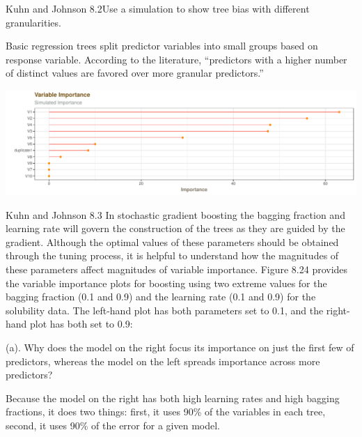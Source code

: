 \documentclass[]{report}
\begin{document}

\begin{question}{Kuhn and Johnson 8.2}Use a simulation to show tree bias with different granularities.\end{question}

Basic regression trees split predictor variables into small groups based
on response variable. According to the literature, ``predictors with a
higher number of distinct values are favored over more granular
predictors.''

\includegraphics{Homework-Two2_files/figure-latex/kj-8.2-1.pdf}


\begin{question}{Kuhn and Johnson 8.3} In stochastic gradient boosting the bagging fraction and learning rate will govern the construction of the trees as they are guided by the gradient. Although the optimal values of these parameters should be obtained through the tuning process, it is helpful to understand how the magnitudes of these parameters affect magnitudes of variable importance. Figure 8.24 provides the variable importance plots for boosting using two extreme values for the bagging fraction (0.1 and 0.9) and the learning rate (0.1 and 0.9) for the solubility data. The left-hand plot has both parameters set to 0.1, and the right-hand plot has both set to 0.9: \end{question}

\begin{subquestion}{(a).} Why does the model on the right focus its importance on just the first few of predictors, whereas the model on the left spreads importance across more predictors? \end{subquestion}

Because the model on the right has both high learning rates and high
bagging fractions, it does two things: first, it uses 90\% of the
variables in each tree, second, it uses 90\% of the error for a given
model.
\end{document}
